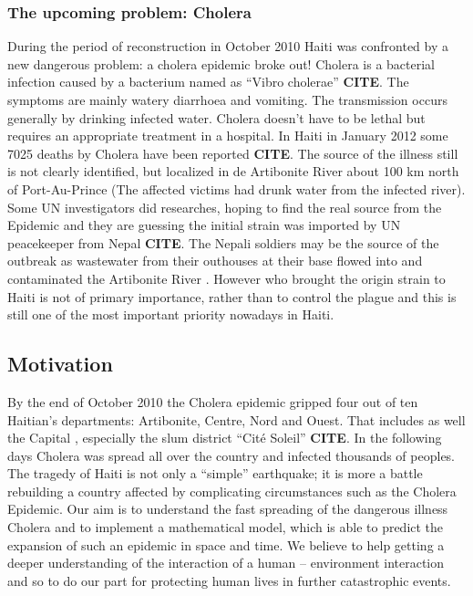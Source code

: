 \documentclass[11pt]{article}
\begin{document}
\subsubsection*{The upcoming problem: Cholera}
During the period of reconstruction in October 2010 Haiti was confronted by a new dangerous problem: a cholera epidemic broke out! 
\newline
Cholera is a bacterial infection caused by a bacterium named as “Vibro cholerae” \textbf{CITE}. The symptoms are mainly watery diarrhoea and vomiting. The transmission occurs generally by drinking infected water. Cholera doesn’t have to be lethal but requires an appropriate treatment in a hospital. In Haiti in January 2012 some 7025 deaths by Cholera have been reported \textbf{CITE}.
The source of the illness still is not clearly identified, but localized in de Artibonite River about 100 km north of Port-Au-Prince (The affected victims had drunk water from the infected river). Some UN investigators did researches, hoping to find the real source from the Epidemic and they are guessing the initial strain was imported by UN peacekeeper from Nepal \textbf{CITE}. The Nepali soldiers may be the source of the outbreak as wastewater from their outhouses at their base flowed into and contaminated the Artibonite River  . However who brought the origin strain to Haiti is not of primary importance, rather than to control the plague and this is still one of the most important priority nowadays in Haiti.

\subsection{Motivation}
By the end of October 2010 the Cholera epidemic gripped four out of ten Haitian’s departments: Artibonite, Centre, Nord and Ouest. That includes as well the Capital , especially the slum district “Cité Soleil” \textbf{CITE}. In the following days Cholera was spread all over the country and infected thousands of peoples. The tragedy of Haiti is not only a “simple” earthquake; it is more a battle rebuilding a country affected by complicating circumstances such as the Cholera Epidemic. 
\newline
Our aim is to understand the fast spreading of the dangerous illness Cholera and to implement a mathematical model, which is able to predict the expansion of such an epidemic in space and time. We believe to help getting a deeper understanding of the interaction of a human – environment interaction and so to do our part for protecting human lives in further catastrophic events.
\end{document}
